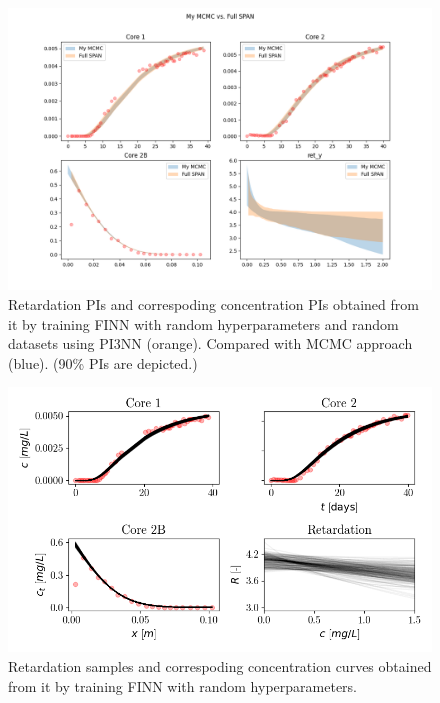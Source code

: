 \begin{figure}[h]
    \centering
    \includegraphics{figs/finn_My MCMCvsFull SPAN_PIs.png}
    \caption{Retardation PIs and correspoding concentration PIs obtained from it by training FINN with random hyperparameters and random datasets using PI3NN (orange). Compared with MCMC approach (blue). (90\% PIs are depicted.)}
    \label{fig:mcmc_vs_fullspan}
\end{figure}


\begin{figure}[h]
    \centering
    \includegraphics{figs/finn_span_samples.png}
    \caption{Retardation samples and correspoding concentration curves obtained from it by training FINN with random hyperparameters.}
    \label{fig:span_samples}
\end{figure}

